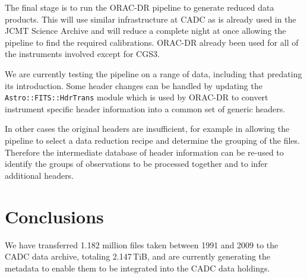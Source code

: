 \documentclass[11pt,twoside]{article}
\begin{document}
The final stage is to run the ORAC-DR pipeline
\citep{1999ASPC..172...11E,2008AN....329..295C}
to generate reduced
data products.
This will use similar infrastructure at CADC as is already
used in the JCMT Science Archive
\citep{2011ASPC..442..203E}
and will reduce a complete night at once allowing
the pipeline to find the required calibrations.
ORAC-DR already been used for all of the instruments
involved except for CGS3.

We are currently testing the pipeline on a range of data,
including that predating its introduction.
Some header changes can be handled by updating the
\texttt{Astro::FITS::HdrTrans} module
\citep[section 2.2]{2008AN....329..295C}
which is used by ORAC-DR to convert
instrument specific header information into
a common set of generic headers.

In other cases the original headers are insufficient,
for example in allowing the pipeline to
select a data reduction recipe and determine the
grouping of the files.
Therefore the intermediate database of header information
can be re-used to identify
the groups of observations to be processed together and to infer
additional headers.


\section{Conclusions}

We have transferred 1.182 million files taken between 1991 and 2009 to
the CADC data archive, totaling 2.147\,TiB, and are currently generating
the metadata to enable them to be integrated into the CADC data
holdings.


\end{document}

